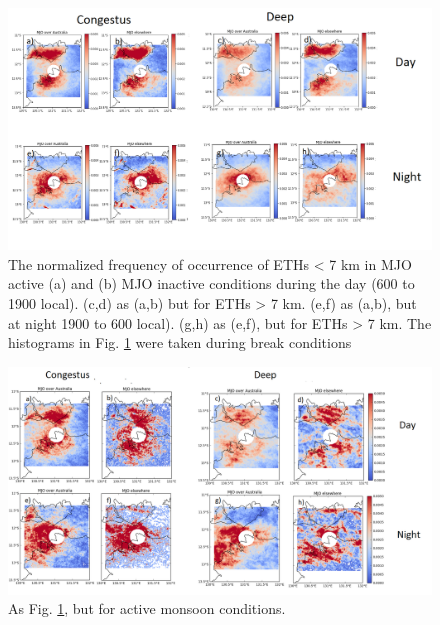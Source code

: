 \documentclass[journal abbreviation, manuscript]{copernicus}
\begin{document}
\begin{figure}[t]
\includegraphics[width=18cm]{spatial_distribution_break.png}
\caption{The normalized frequency of occurrence of ETHs < 7 km in MJO active (a) and (b) MJO inactive conditions during the day (600 to 1900 local). (c,d) as (a,b) but for ETHs > 7 km. (e,f) as (a,b), but at night 1900 to 600 local). (g,h) as (e,f), but for ETHs > 7 km. The histograms in Fig. \ref{fig:spatial_distribution_break} were taken during break conditions}
\label{fig:spatial_distribution_break}
\end{figure}
\clearpage

\begin{figure}[t]
\includegraphics[width=18cm]{spatial_distribution_monsoon.png}
\caption{As Fig. \ref{fig:spatial_distribution_break}, but for active monsoon conditions.}
\label{fig:spatial_distribution_monsoon}
\end{figure}
\clearpage
\end{document}
